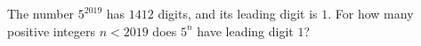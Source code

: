 The number $5^{2019}$ has $1412$ digits, and its leading digit is $1$. For how many positive integers $n<2019$ does $5^n$ have leading digit $1$?
